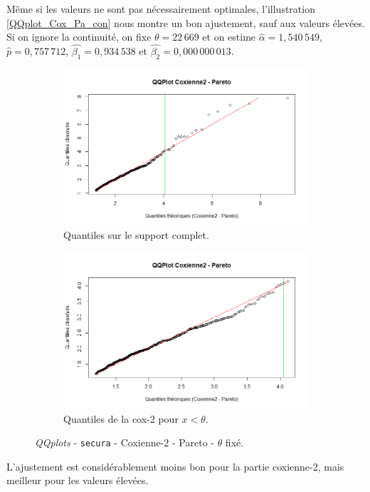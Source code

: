 		Même si les valeurs ne sont pas nécessairement optimales, l'illustration \ref{QQplot_Cox_Pa_con} nous montre un bon ajustement, sauf aux valeurs élevées.  \\
		
		Si on ignore la continuité, on fixe $\theta = 22\,669$ et on estime $\hat{\alpha} = 1,540\,549$, $\hat{p} =0,757\,712$, $\hat{\beta_1}=0,934\,538$ et $\hat{\beta_2} =0,000\,000\,013$.	
		\begin{figure}[H]
			\begin{center}
				\begin{subfigure}[b]{0.45\textwidth}
					\includegraphics[scale=0.40]{Graphiques/QQ_Cox_pa_choix_secura} 
					\caption{Quantiles sur le support complet.} \label{QQplot_Cox_pa_choix_sec}
				\end{subfigure}
				\begin{subfigure}[b]{0.4\textwidth}
					\includegraphics[scale=0.40]{Graphiques/QQ_Cox_pa_choix_t1_secura} 
					\caption{Quantiles de la cox-2 pour $x<\theta$.} \label{QQplot_Cox_pa_choix_2_sec}
				\end{subfigure}
				\renewcommand{\figurename}{Illustration}
				\caption{\textit{QQplots} - \texttt{secura} - Coxienne-2 - Pareto - $\theta$ fixé.}
			\end{center}
		\end{figure}
		L'ajustement est considérablement moins bon pour la partie coxienne-2, mais meilleur pour les valeurs élevées.\\
	
